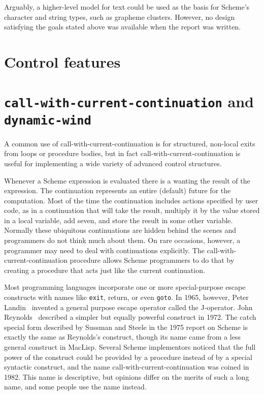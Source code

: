 \documentclass[twoside,twocolumn]{algol60}
\begin{document}
Arguably, a higher-level model for text could be used as the basis for
Scheme's character and string types, such as grapheme clusters.
However, no design satisfying the goals stated above was available
when the report was written.

\section{Control features}

\section{{\tt call-with-current-continuation} and {\tt dynamic-wind}}

\vest A common use of {\cf call-with-current-continuation} is for
structured, non-local exits from loops or procedure bodies, but in fact
{\cf call-with-current-continuation} is useful for implementing a
wide variety of advanced control structures.

\vest Whenever a Scheme expression is evaluated there is a
 wanting the result of the expression.  The continuation
represents an entire (default) future for the computation.
Most of the time the continuation includes actions
specified by user code, as in a continuation that will take the result,
multiply it by the value stored in a local variable, add seven, and store
the result in some other variable.  Normally these
ubiquitous continuations are hidden behind the scenes and programmers do not
think much about them.  On rare occasions, however, a programmer may
need to deal with continuations explicitly.
The {\cf call-with-current-continuation} procedure allows Scheme programmers to do
that by creating a procedure that acts just like the current
continuation.

\vest Most programming languages incorporate one or more special-purpose
escape constructs with names like {\tt exit}, \hbox{{\cf return}}, or
even {\tt goto}.  In 1965, however, Peter Landin~\cite{Landin65}
invented a general purpose escape operator called the J-operator.  John
Reynolds~\cite{Reynolds72} described a simpler but equally powerful
construct in 1972.  The {\cf catch} special form described by Sussman
and Steele in the 1975 report on Scheme is exactly the same as
Reynolds's construct, though its name came from a less general construct
in MacLisp.  Several Scheme implementors noticed that the full power of the
 construct could be provided by a procedure instead of by a
special syntactic construct, and the name
{\cf call-with-current-continuation} was coined in 1982.  This name is
descriptive, but opinions differ on the merits of such a long name, and
some people use the name  instead.
\end{document}
